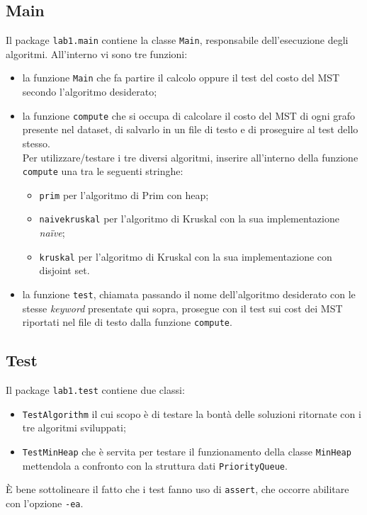 \subsection{Main}
Il package \texttt{lab1.main} contiene la classe \texttt{Main}, responsabile dell'esecuzione degli algoritmi. All'interno vi sono tre funzioni:
\begin{itemize}
	\item la funzione \texttt{Main} che fa partire il calcolo oppure il test del costo del MST secondo l'algoritmo desiderato;
	\item la funzione \texttt{compute} che si occupa di calcolare il costo del MST di ogni grafo presente nel dataset, di salvarlo in un file di testo e di proseguire al test dello stesso.\\
	Per utilizzare/testare i tre diversi algoritmi, inserire all'interno della funzione \texttt{compute} una tra le seguenti stringhe:
	\begin{itemize}
		\item \texttt{prim} per l'algoritmo di Prim con heap;
		\item \texttt{naivekruskal} per l'algoritmo di Kruskal con la sua implementazione \emph{na\"ive};
		\item \texttt{kruskal} per l'algoritmo di Kruskal con la sua implementazione con disjoint set.
	\end{itemize}
    \item la funzione \texttt{test}, chiamata passando il nome dell'algoritmo desiderato con le stesse \emph{keyword} presentate qui sopra, prosegue con il test sui cost dei MST riportati nel file di testo dalla funzione \texttt{compute}.
\end{itemize}

\subsection{Test}
Il package \texttt{lab1.test} contiene due classi:
\begin{itemize}
	\item \texttt{TestAlgorithm} il cui scopo è di testare la bontà delle soluzioni ritornate con i tre algoritmi sviluppati;
	\item \texttt{TestMinHeap} che è servita per testare il funzionamento della classe \texttt{MinHeap} mettendola a confronto con la struttura dati \texttt{PriorityQueue}.
\end{itemize}
È bene sottolineare il fatto che i test fanno uso di \texttt{assert}, che occorre abilitare con l'opzione \texttt{-ea}.

